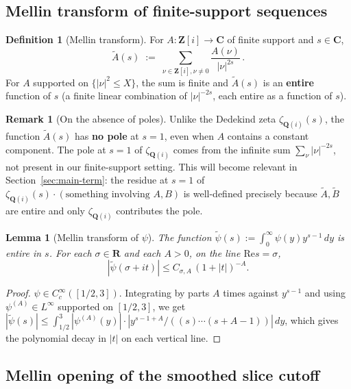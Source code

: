 \documentclass[11pt]{article}
\newtheorem{lemma}[theorem]{Lemma}
\theoremstyle{definition}
\newtheorem{definition}[theorem]{Definition}
\newtheorem{remark}[theorem]{Remark}
\newcommand{\Z}{\mathbf{Z}}
\newcommand{\Q}{\mathbf{Q}}
\newcommand{\R}{\mathbf{R}}
\newcommand{\C}{\mathbf{C}}
\newcommand{\Zi}{\Z[i]}
\newcommand{\Qi}{\Q(i)}
\renewcommand{\Re}{\mathrm{Re}}
\begin{document}
\subsection{Mellin transform of finite-support sequences}\label{ssec:mellin-A}

\begin{definition}[Mellin transform]\label{def:mellin-A}
For $A:\Zi\to\C$ of finite support and $s\in\C$,
\[
   \widetilde A(s)\;:=\;\sum_{\nu\in\Zi,\nu\ne 0}\frac{A(\nu)}{|\nu|^{2s}}\,.
\]
For $A$ supported on $\{|\nu|^2\le X\}$, the sum is finite and $\widetilde A(s)$ is an \textbf{entire} function of $s$ (a finite linear combination of $|\nu|^{-2s}$, each entire as a function of $s$).
\end{definition}

\begin{remark}[On the absence of poles]\label{rem:no-pole}
Unlike the Dedekind zeta $\zeta_{\Qi}(s)$, the function $\widetilde A(s)$ has \textbf{no pole} at $s=1$, even when $A$ contains a constant component. The pole at $s=1$ of $\zeta_{\Qi}$ comes from the infinite sum $\sum_\nu|\nu|^{-2s}$, not present in our finite-support setting. This will become relevant in Section~\ref{sec:main-term}: the residue at $s=1$ of $\zeta_{\Qi}(s)\cdot(\text{something involving }A,B)$ is well-defined precisely because $\widetilde A,\widetilde B$ are entire and only $\zeta_{\Qi}$ contributes the pole.
\end{remark}

\begin{lemma}[Mellin transform of $\psi$]\label{lem:mellin-psi}
The function $\widetilde\psi(s):=\int_0^\infty\psi(y)y^{s-1}\,dy$ is entire in $s$. For each $\sigma\in\R$ and each $A>0$, on the line $\Re s=\sigma$,
\[
   |\widetilde\psi(\sigma+it)|\le C_{\sigma,A}\,(1+|t|)^{-A}.
\]
\end{lemma}

\begin{proof}
$\psi\in C_c^\infty([1/2,3])$. Integrating by parts $A$ times against $y^{s-1}$ and using $\psi^{(A)}\in L^\infty$ supported on $[1/2,3]$, we get $|\widetilde\psi(s)|\le\int_{1/2}^3|\psi^{(A)}(y)|\cdot|y^{s-1+A}/((s)\cdots(s+A-1))|\,dy$, which gives the polynomial decay in $|t|$ on each vertical line.
\end{proof}

\subsection{Mellin opening of the smoothed slice cutoff}\label{ssec:mellin-cutoff}
\end{document}

